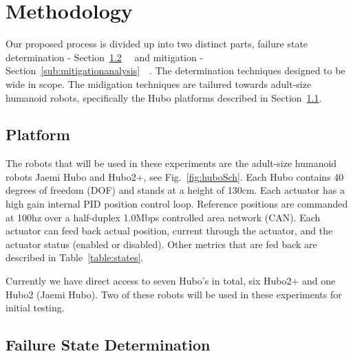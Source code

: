 \section{Methodology}

Our proposed process is divided up into two distinct parts, failure state 
determination - Section~\ref{sub:FailureStateDetermination}~~ and mitigation - Section~\ref{sub:mitigationanalysis}~~.  The determination techniques designed to be 
wide in scope.  The midigation techniques are tailured towards adult-size
humanoid robots, specifically the Hubo platforms described in Section~\ref{sec:platform}.

 
\subsection{Platform}\label{sec:platform}
The robots that will be used in these experiments are the adult-size 
humanoid robots Jaemi Hubo and Hubo2+, see Fig.~\ref{fig:huboSch}.  
Each Hubo contains 40 degrees of freedom (DOF) and stands at a height of 130cm.
Each actuator has a high gain internal PID position control loop.  Reference positions are
commanded at 100hz over a half-duplex 1.0Mbps controlled area network (CAN).
Each actuator can feed back actual position, current through the actuator, and the actuator status 
(enabled or disabled).  Other metrics that are fed back are described in 
Table~\ref{table:states}.  

Currently we have direct access to seven Hubo's in total, six Hubo2+ and one Hubo2 (Jaemi Hubo).
Two of these robots will be used in these experiments for initial testing.




\subsection{Failure State Determination}\label{sub:FailureStateDetermination}




